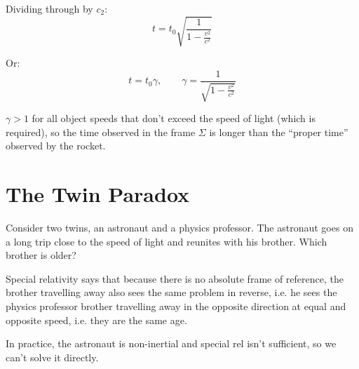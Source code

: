 Dividing through by $c_2$:
\[
    t = t_0 \sqrt{\frac{1}{1 - \frac{v^2}{c^2}}}
\]

Or:
\[
    t = t_0 \gamma, \qquad \gamma = \frac{1}{\sqrt{1 - \frac{v^2}{c^2}}}
\]

$\gamma > 1$ for all object speeds that don't exceed the speed of light (which is required), so the time observed in the frame $\Sigma$ is longer than the ``proper time'' observed by the rocket.

\section{The Twin Paradox}
Consider two twins, an astronaut and a physics professor. The astronaut goes on a long trip close to the speed of light and reunites with his brother. Which brother is older?

Special relativity says that because there is no absolute frame of reference, the brother travelling away also sees the same problem in reverse, i.e. he sees the physics professor brother travelling away in the opposite direction at equal and opposite speed, i.e. they are the same age.

In practice, the astronaut is non-inertial and special rel isn't sufficient, so we can't solve it directly.
